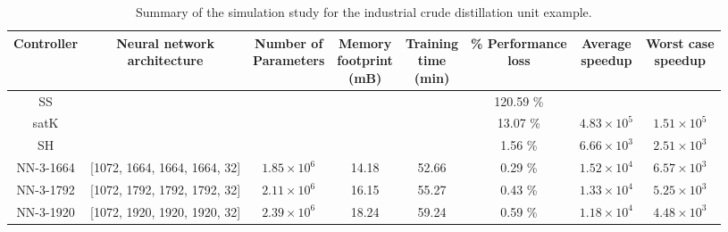 \documentclass[preprint,5p, twocolumn, authoryear]{elsarticle}
\begin{document}
\begin{table}[t]
    \caption{Summary of the simulation study for the industrial crude
    distillation unit example.}
\begin{tabular}{ |c|c|c|c|c|c|c|c| }
          \hline
          Controller & \thead{Neural network \\ architecture} &
          \thead{Number of \\ Parameters} & \thead{Memory \\ footprint \\ (mB)}
          & \thead{Training \\ time \\ (min)} & \thead{\% Performance\\ loss} &
          \thead{Average \\ speedup} & \thead{Worst case \\ speedup} \\
          \hline
      SS &  &  & &  & 120.59 \% &  & \\ 
  satK &  &  &   &  & 13.07 \% & $4.83 \times 10^5$ & $1.51 \times 10^5$ \\ 
  SH &  &  &  &  & 1.56 \% & $6.66 \times 10^3$  & $2.51 \times 10^3$ \\ 
  NN-3-1664 & [1072, 1664, 1664, 1664, 32] & $1.85 \times 10^6$ & 14.18 & 52.66
  & 0.29 \% & $1.52 \times 10^4$ & $6.57 \times 10^3$  \\ 
  NN-3-1792 & [1072, 1792, 1792, 1792, 32]  & $2.11 \times 10^6$ & 16.15  &
  55.27 & 0.43 \% & $1.33 \times 10^4$ & $5.25 \times 10^3$ \\ 
  NN-3-1920 & [1072, 1920, 1920, 1920, 32]  & $2.39 \times 10^6$ & 18.24  &
  59.24 & 0.59 \% & $1.18 \times 10^4$ & $4.48 \times 10^3$ \\ 
\hline
\end{tabular}
\label{table:cdu}      
\end{table}
\end{document}
